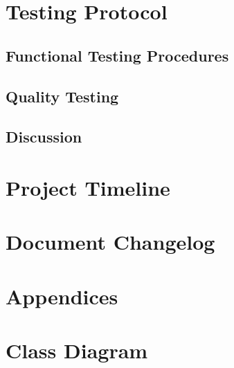 \documentclass{article}
\begin{document}
	\section{Testing Protocol}
	\subsection{Functional Testing Procedures}
	
	
	\subsection{Quality Testing}
	
	
	\subsection{Discussion}
	
	\pagebreak
	

	
	\section{Project Timeline}
	
	\pagebreak
	
	\section{Document Changelog}
	
	\pagebreak
	
	\appendix
	\section*{Appendices}
	\section{Class Diagram}
\end{document}
